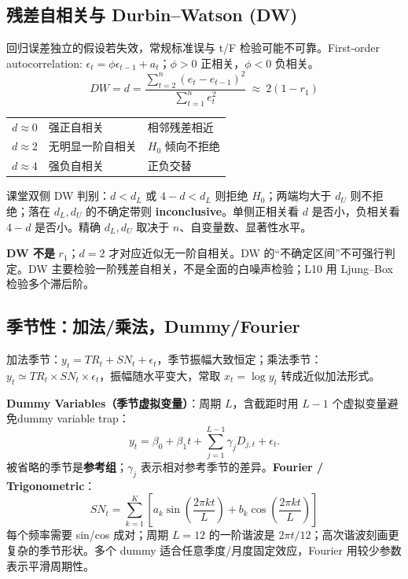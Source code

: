 \documentclass[UTF8,fontset=fandol,10.5pt,a4paper]{ctexart}
\newcommand{\eng}[1]{{\sffamily\color{navy}#1}}
\newcommand{\formula}[1]{\[\boxed{#1}\]}
\newcommand{\thick}{\renewcommand{\arraystretch}{1.18}}
\begin{document}
\subsection{残差自相关与 Durbin--Watson (DW)}
回归误差独立的假设若失效，常规标准误与 t/F 检验可能不可靠。\eng{First-order autocorrelation}: $\epsilon_t=\phi\epsilon_{t-1}+a_t$；$\phi>0$ 正相关，$\phi<0$ 负相关。
\formula{DW=d=\frac{\sum_{t=2}^{n}(e_t-e_{t-1})^2}{\sum_{t=1}^{n}e_t^2}\ \approx\ 2(1-r_1)}
\begin{center}\thick\begin{tabular}{lll}\toprule
$d\approx0$ & 强正自相关 & 相邻残差相近 \\
$d\approx2$ & 无明显一阶自相关 & $H_0$ 倾向不拒绝 \\
$d\approx4$ & 强负自相关 & 正负交替 \\
\bottomrule\end{tabular}\end{center}
课堂双侧 DW 判别：$d<d_L$ 或 $4-d<d_L$ 则拒绝 $H_0$；两端均大于 $d_U$ 则不拒绝；落在 $d_L,d_U$ 的不确定带则 \textbf{inconclusive}。单侧正相关看 $d$ 是否小，负相关看 $4-d$ 是否小。精确 $d_L,d_U$ 取决于 $n$、自变量数、显著性水平。 
\begin{pitbox}
\textbf{DW 不是 }$r_1$；$d=2$ 才对应近似无一阶自相关。DW 的“不确定区间”不可强行判定。DW 主要检验一阶残差自相关，不是全面的白噪声检验；L10 用 Ljung--Box 检验多个滞后阶。
\end{pitbox}
\subsection{季节性：加法/乘法，Dummy/Fourier}
加法季节：$y_t=TR_t+SN_t+\epsilon_t$，季节振幅大致恒定；乘法季节：$y_t\simeq TR_t\times SN_t\times\epsilon_t$，振幅随水平变大，常取 $x_t=\log y_t$ 转成近似加法形式。
\par\smallskip{}\par\smallskip
\textbf{Dummy Variables（季节虚拟变量）}：周期 $L$，含截距时用 $L-1$ 个虚拟变量避免\eng{dummy variable trap}：
\[y_t=\beta_0+\beta_1t+\sum_{j=1}^{L-1}\gamma_j D_{j,t}+\epsilon_t.\]
被省略的季节是\textbf{参考组}；$\gamma_j$ 表示相对参考季节的差异。\textbf{Fourier / Trigonometric}：
\formula{SN_t=\sum_{k=1}^{K}\left[a_k\sin\left(\frac{2\pi kt}{L}\right)+b_k\cos\left(\frac{2\pi kt}{L}\right)\right]}
每个频率需要 sin/cos 成对；周期 $L=12$ 的一阶谐波是 $2\pi t/12$；高次谐波刻画更复杂的季节形状。多个 dummy 适合任意季度/月度固定效应，Fourier 用较少参数表示平滑周期性。
\end{document}

